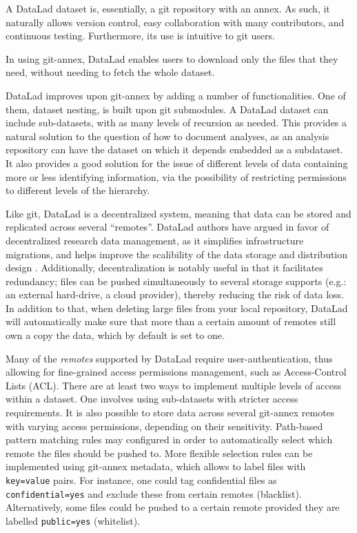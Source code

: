 \documentclass[smallextended]{svjour3}       %
\begin{document}
A DataLad dataset is, essentially, a git repository with an annex. As such, it naturally allows version control, easy collaboration with many contributors, and continuous testing. Furthermore, its use is intuitive to git users.

In using git-annex, DataLad enables users to download only the files that they need, without needing to fetch the whole dataset.

DataLad improves upon git-annex by adding a number of functionalities. One of them, dataset nesting, is built upon git submodules. A DataLad dataset can include sub-datasets, with as many levels of recursion as needed. This provides a natural solution to the question of how to document analyses, as an analysis repository can have the dataset on which it depends embedded as a subdataset. It also provides a good solution for the issue of different levels of data containing more or less identifying information, via the possibility of restricting permissions to different levels of the hierarchy.

Like git, DataLad is a decentralized system, meaning that data can be stored and replicated across several ``remotes''. DataLad authors have argued in favor of decentralized research data management, as it simplifies infrastructure migrations, and helps improve the scalibility of the data storage and distribution design \cite{decentralization_hanke}. Additionally, decentralization is notably useful in that it facilitates redundancy; files can be pushed simultaneously to several storage supports (e.g.: an external hard-drive, a cloud provider), thereby reducing the risk of data loss. In addition to that, when deleting large files from your local repository, DataLad will automatically make sure that more than a certain amount of remotes still own a copy the data, which by default is set to one.

Many of the \emph{remotes} supported by DataLad require user-authentication, thus allowing for fine-grained access permissions management, such as Access-Control Lists (ACL). There are at least two ways to implement multiple levels of access within a dataset. One involves using sub-datasets with stricter access requirements. It is also possible to store data across several git-annex remotes with varying access permissions, depending on their sensitivity. Path-based pattern matching rules may configured in order to automatically select which remote the files should be pushed to. More flexible selection rules can be implemented using git-annex metadata, which allows to label files with \texttt{key=value} pairs. For instance, one could tag confidential files as \texttt{confidential=yes} and exclude these from certain remotes (blacklist). Alternatively, some files could be pushed to a certain remote provided they are labelled \texttt{public=yes} (whitelist).
\end{document}
